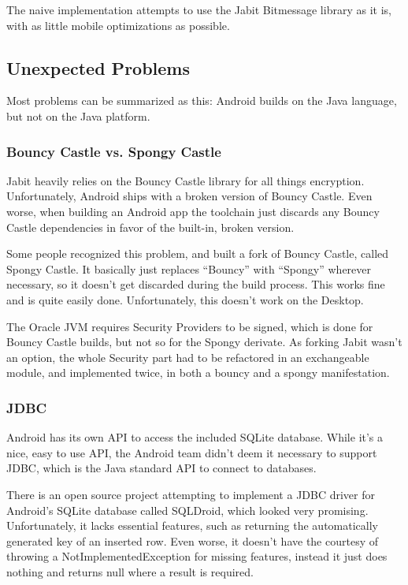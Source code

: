 \documentclass{bfh}
\begin{document}
  The naive implementation attempts to use the Jabit Bitmessage library as it is, with as little mobile optimizations as possible.

  \subsection{Unexpected Problems}
  Most problems can be summarized as this: Android builds on the Java language, but not on the Java platform.
  
  \subsubsection{Bouncy Castle vs. Spongy Castle}
  Jabit heavily relies on the Bouncy Castle library for all things encryption. Unfortunately, Android ships with a broken version of Bouncy Castle. Even worse, when building an Android app the toolchain just discards any Bouncy Castle dependencies in favor of the built-in, broken version.

  Some people recognized this problem, and built a fork of Bouncy Castle, called Spongy Castle. It basically just replaces “Bouncy” with “Spongy” wherever necessary, so it doesn’t get discarded during the build process. This works fine and is quite easily done. Unfortunately, this doesn’t work on the Desktop.

  The Oracle JVM requires Security Providers to be signed, which is done for Bouncy Castle builds, but not so for the Spongy derivate. As forking Jabit wasn’t an option, the whole Security part had to be refactored in an exchangeable module, and implemented twice, in both a bouncy and a spongy manifestation.

  \subsubsection{JDBC}
  Android has its own API to access the included SQLite database. While it’s a nice, easy to use API, the Android team didn’t deem it necessary to support JDBC, which is the Java standard API to connect to databases.

  There is an open source project attempting to implement a JDBC driver for Android’s SQLite database called SQLDroid, which looked very promising. Unfortunately, it lacks essential features, such as returning the automatically generated key of an inserted row. Even worse, it doesn't have the courtesy of throwing a NotImplementedException for missing features, instead it just does nothing and returns null where a result is required.
\end{document}
